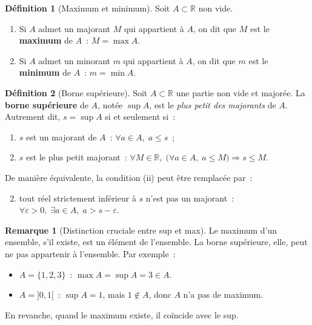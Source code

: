 \documentclass[12pt,a4paper,openany]{book}
\theoremstyle{definition}
\newtheorem{definition}{Définition}[chapter]
\newtheorem{remarque}{Remarque}[chapter]
\newcommand{\R}{\mathbb{R}}
\newcommand{\eps}{\varepsilon}
\begin{document}
\begin{definition}[Maximum et minimum]\label{def:max-min}
  Soit $A \subset \R$ non vide.
  \begin{enumerate}[label=(\roman*)]
    \item Si $A$ admet un majorant $M$ qui appartient à $A$, on dit que $M$ est le \textbf{maximum} de $A$~: $M = \max A$.
    \item Si $A$ admet un minorant $m$ qui appartient à $A$, on dit que $m$ est le \textbf{minimum} de $A$~: $m = \min A$.
  \end{enumerate}
\end{definition}

\begin{definition}[Borne supérieure]\label{def:borne-sup}
  Soit $A \subset \R$ une partie non vide et majorée. La \textbf{borne supérieure} de $A$, notée $\sup A$, est le \emph{plus petit des majorants} de $A$. Autrement dit, $s = \sup A$ si et seulement si~:
  \begin{enumerate}[label=(\roman*)]
    \item $s$ est un majorant de $A$~: $\forall a \in A,\; a \leq s$~;
    \item $s$ est le plus petit majorant~: $\forall M \in \R,\; \bigl(\forall a \in A,\; a \leq M\bigr) \Rightarrow s \leq M$.
  \end{enumerate}
  De manière équivalente, la condition (ii) peut être remplacée par~:
  \begin{enumerate}[label=(\roman*')]
    \setcounter{enumi}{1}
    \item tout réel strictement inférieur à $s$ n'est pas un majorant~: $\forall \eps > 0,\; \exists a \in A,\; a > s - \eps$.
  \end{enumerate}
\end{definition}

\begin{remarque}[Distinction cruciale entre sup et max]\label{rem:sup-vs-max}
  Le maximum d'un ensemble, s'il existe, est un élément de l'ensemble. La borne supérieure, elle, peut ne pas appartenir à l'ensemble. Par exemple~:
  \begin{itemize}
    \item $A = \{1, 2, 3\}$~: $\max A = \sup A = 3 \in A$.
    \item $A = {]0, 1[}$~: $\sup A = 1$, mais $1 \notin A$, donc $A$ n'a pas de maximum.
  \end{itemize}
  En revanche, quand le maximum existe, il coïncide avec le sup.
\end{remarque}
\end{document}
